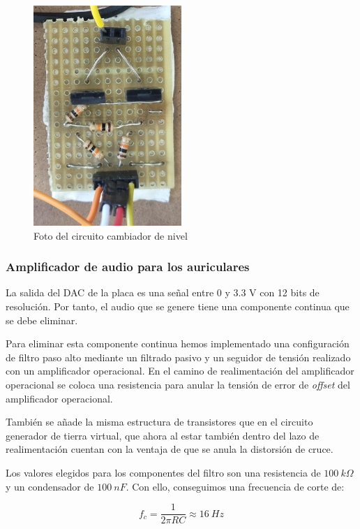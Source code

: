\begin{figure}[h]
    \centering
    \includegraphics[width=0.5\textwidth]{images/2/2-2/cambiadorNivel.jpg}
    \caption{Foto del circuito cambiador de nivel}
    \label{fig:2-2-foto-cambiador}
\end{figure}
\subsubsection{Amplificador de audio para los auriculares}

La salida del DAC de la placa es una señal entre 0 y 3.3 V con 12 bits de resolución. Por tanto, el audio que se genere tiene una componente continua que se debe eliminar. 

Para eliminar esta componente continua hemos implementado una configuración de filtro paso alto mediante un filtrado pasivo y un seguidor de tensión realizado con un amplificador operacional. En el camino de realimentación del amplificador operacional se coloca una resistencia para anular la tensión de error de \textit{offset} del amplificador operacional.

También se añade la misma estructura de transistores que en el circuito generador de tierra virtual, que ahora al estar también dentro del lazo de realimentación cuentan con la ventaja de que se anula la distorsión de cruce. 

Los valores elegidos para los componentes del filtro son una resistencia de $100\ k\Omega$ y un condensador de $100\ nF$. Con ello, conseguimos una frecuencia de corte de:

\[
    f_c = \frac{1}{2\pi RC} \approx 16\ Hz    
\]

